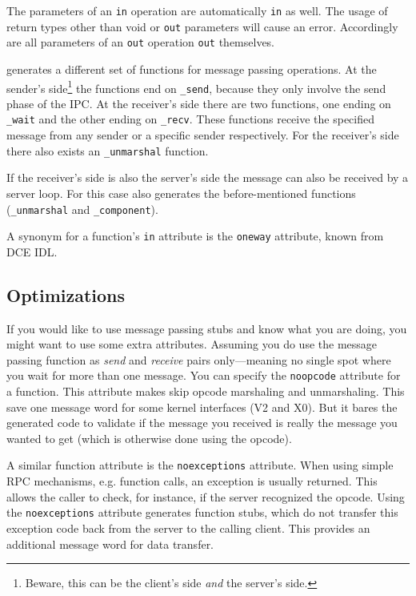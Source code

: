 The parameters of an \verb|in| operation are automatically \verb|in| as
well. The usage of return types other than void or \verb|out| parameters
will cause an error. Accordingly are all parameters of an \verb|out|
operation \verb|out| themselves.

\dice{} generates a different set of functions for message passing
operations. At the sender's side\footnote{Beware, this can be the client's
side \emph{and} the server's side.} the functions end on \verb|_send|, because
they only involve the send phase of the IPC. At the receiver's side
there are two functions, one ending on \verb|_wait| and the other ending
on \verb|_recv|. These functions receive the specified message from
any sender or a specific sender respectively. For the receiver's side
there also exists an \verb|_unmarshal| function.

If the receiver's side is also the server's side the message
can also be received by a server loop. For this case \dice{} also
generates the before-mentioned functions (\verb|_unmarshal| and 
\verb|_component|). 

A synonym for a function's \verb|in| attribute is the \verb|oneway|
attribute, known from DCE IDL.

\subsection{Optimizations}
If you would like to use message passing stubs and know what you are
doing, you might want to use some extra attributes. Assuming you do
use the message passing function as \emph{send} and \emph{receive}
pairs only---meaning no single spot where you wait for more than one
message. You can specify the \verb|noopcode| attribute for a function.
This attribute makes \dice{} skip opcode marshaling and unmarshaling.
This save one message word for some kernel interfaces (V2 and X0).
But it bares the generated code to validate if the message you received
is really the message you wanted to get (which is otherwise done using
the opcode).

A similar function attribute is the \verb|noexceptions| attribute. When
using simple RPC mechanisms, e.g. function calls, an exception is 
usually returned. This allows the caller to check, for instance, if the
server recognized the opcode. Using the \verb|noexceptions| attribute
generates function stubs, which do not transfer this exception code
back from the server to the calling client. This provides an additional
message word for data transfer.

